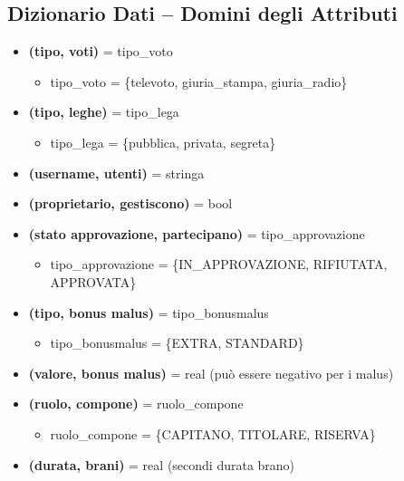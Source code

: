 \documentclass[a4paper,12pt]{article}
\begin{document}
\subsection{Dizionario Dati – Domini degli Attributi}
	\begin{itemize}
		\item \textbf{(tipo, voti)} = tipo\_voto
		\begin{itemize}
			\item tipo\_voto = \{televoto, giuria\_stampa, giuria\_radio\}
		\end{itemize}
		
		\item \textbf{(tipo, leghe)} = tipo\_lega
		\begin{itemize}
			\item tipo\_lega = \{pubblica, privata, segreta\}
		\end{itemize}
		
		\item \textbf{(username, utenti)} = stringa
		
		\item \textbf{(proprietario, gestiscono)} = bool
		
		\item \textbf{(stato approvazione, partecipano)} = tipo\_approvazione
		\begin{itemize}
			\item tipo\_approvazione = \{IN\_APPROVAZIONE, RIFIUTATA, APPROVATA\}
		\end{itemize}
		
		\item \textbf{(tipo, bonus malus)} = tipo\_bonusmalus
		\begin{itemize}
			\item tipo\_bonusmalus = \{EXTRA, STANDARD\}
		\end{itemize}
		
		\item \textbf{(valore, bonus malus)} = real (può essere negativo per i malus)
		
		\item \textbf{(ruolo, compone)} = ruolo\_compone
		\begin{itemize}
			\item ruolo\_compone = \{CAPITANO, TITOLARE, RISERVA\}
		\end{itemize}
		
		\item \textbf{(durata, brani)} = real (secondi durata brano)
	\end{itemize}
\newpage
\end{document}
